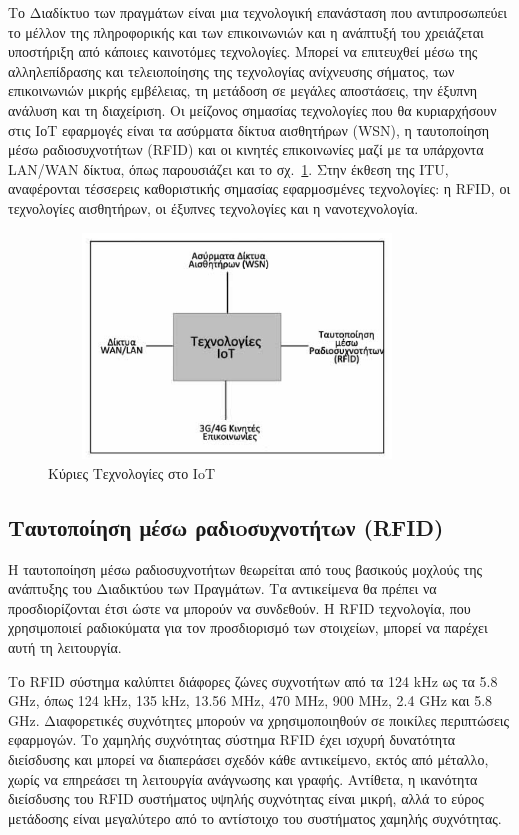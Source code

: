 \documentclass[12pt, a4paper, oneside]{report}
\begin{document}
Το Διαδίκτυο των πραγμάτων είναι μια τεχνολογική επανάσταση που αντιπροσωπεύει το μέλλον της πληροφορικής και των επικοινωνιών και η ανάπτυξή του χρειάζεται υποστήριξη από κάποιες καινοτόμες τεχνολογίες. Μπορεί να επιτευχθεί μέσω της αλληλεπίδρασης και τελειοποίησης της τεχνολογίας ανίχνευσης σήματος, των επικοινωνιών μικρής εμβέλειας, τη μετάδοση σε μεγάλες αποστάσεις, την έξυπνη ανάλυση και τη διαχείριση. Οι μείζονος σημασίας τεχνολογίες που θα κυριαρχήσουν στις ΙοΤ εφαρμογές είναι τα ασύρματα δίκτυα αισθητήρων (WSN), η ταυτοποίηση μέσω ραδιοσυχνοτήτων (RFID) και οι κινητές επικοινωνίες μαζί με τα υπάρχοντα LAN\slash WAN δίκτυα, όπως παρουσιάζει και το σχ.~\ref{eik8}. Στην έκθεση της ΙΤU, αναφέρονται τέσσερεις καθοριστικής σημασίας εφαρμοσμένες τεχνολογίες: η RFID, οι τεχνολογίες αισθητήρων, οι έξυπνες τεχνολογίες και η νανοτεχνολογία.
\begin{figure}[!hbt]
\centering
\includegraphics[height=6cm,width=10cm]{eikona_08}
\caption[Κύριες Τεχνολογίες στο IoT]{Κύριες Τεχνολογίες στο IoT\cite{zwtou}}\label{eik8}
\end{figure}

\subsection{Ταυτοποίηση μέσω ραδιoσυχνοτήτων (RFID)}

Η ταυτοποίηση μέσω ραδιοσυχνοτήτων θεωρείται από τους βασικούς μοχλούς της ανάπτυξης του Διαδικτύου των Πραγμάτων. Τα αντικείμενα θα πρέπει να προσδιορίζονται έτσι ώστε να μπορούν να συνδεθούν. Η RFID τεχνολογία, που χρησιμοποιεί ραδιοκύματα για τον προσδιορισμό των στοιχείων, μπορεί να παρέχει αυτή τη λειτουργία.

Το RFID σύστημα καλύπτει διάφορες ζώνες συχνοτήτων από τα 124 kHz ως τα 5.8 GHz, όπως 124 kHz, 135 kHz, 13.56 ΜHz, 470 ΜHz, 900 ΜHz, 2.4 GHz και 5.8 GHz. Διαφορετικές συχνότητες μπορούν να χρησιμοποιηθούν σε ποικίλες περιπτώσεις εφαρμογών. Το χαμηλής συχνότητας σύστημα RFID έχει ισχυρή δυνατότητα διείσδυσης και μπορεί να διαπεράσει σχεδόν κάθε αντικείμενο, εκτός από μέταλλο, χωρίς να επηρεάσει τη λειτουργία ανάγνωσης και γραφής. Αντίθετα, η ικανότητα διείσδυσης του RFID συστήματος υψηλής συχνότητας είναι μικρή, αλλά το εύρος μετάδοσης είναι μεγαλύτερο από το αντίστοιχο του συστήματος χαμηλής συχνότητας.
\end{document}
